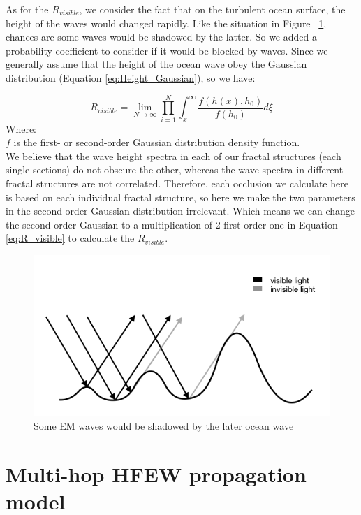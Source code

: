 \documentclass{mcmthesis}
\begin{document}
    As for the $R_{visible}$, we consider the fact that on the turbulent ocean surface, the height of the waves would changed rapidly. Like the situation in Figure ~\ref{fig:visible}, chances are some waves would be shadowed by the latter. So we added a probability coefficient to consider if it would be blocked by waves. Since we generally assume that the height of the ocean wave obey the Gaussian distribution (Equation \ref{eq:Height_Gaussian}), so we have:

    \begin{equation}\label{eq:R_visible}
      R_{visible} = \lim_{N \to \infty} \prod_{i=1}^N \int_{x}^{\infty} \frac{f(h(x),h_0)}{f(h_0)}d\xi
    \end{equation}
    Where:\\
    $f$ is the first- or second-order Gaussian distribution density function.\\

    We believe that the wave height spectra in each of our fractal structures (each single sections) do not obscure the other, whereas the wave spectra in different fractal structures are not correlated. Therefore, each occlusion we calculate here is based on each individual fractal structure, so here we make the two parameters in the second-order Gaussian distribution irrelevant. Which means we can change the second-order Gaussian to a multiplication of 2 first-order one in Equation \ref{eq:R_visible} to calculate the $R_{visible}$.

    \begin{figure}[ht]
      \centering
      \includegraphics[scale=0.3]{Visible}
      \caption{Some EM waves would be shadowed by the later ocean wave}
      \label{fig:visible}
    \end{figure}

\section{Multi-hop HFEW propagation model}
\end{document}
